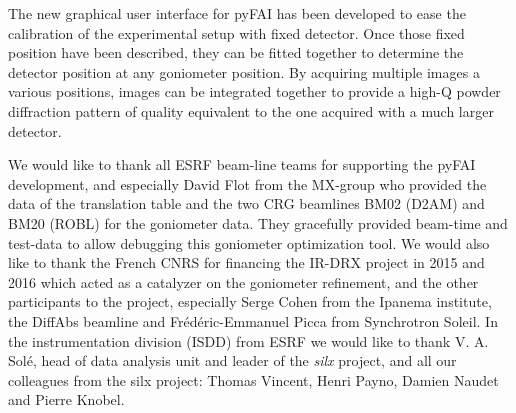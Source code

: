 \documentclass[preprint, pdf]{iucr}              %
\begin{document}
The new graphical user interface for pyFAI has been developed to ease the
calibration of the experimental setup with fixed detector. 
Once those fixed position have been described, they can be fitted together to
determine the detector position at any goniometer position. 
By acquiring multiple images a various positions, images can be
integrated together to provide a high-Q powder diffraction pattern of
quality equivalent to the one acquired with a much larger detector. 



 

We would like to thank all ESRF beam-line teams for supporting the
pyFAI development, and especially David Flot from the MX-group who provided the
data of the translation table and the two CRG beamlines BM02 (D2AM) and BM20
(ROBL) for the goniometer data. 
They gracefully provided beam-time and test-data to allow debugging this 
goniometer optimization tool.
We would also like to thank the French CNRS for financing the IR-DRX project
in 2015 and 2016 which acted as a catalyzer on the goniometer refinement,
and the other participants to the project, especially Serge Cohen from the
Ipanema institute, the DiffAbs beamline and Frédéric-Emmanuel Picca from
Synchrotron Soleil.
In the instrumentation division (ISDD) from ESRF  we would like to thank V. A.
Solé, head of data analysis unit and leader of the \textit{silx} project, and all our
colleagues from the silx project: Thomas Vincent, Henri Payno, Damien Naudet and
Pierre Knobel.
\end{document}
